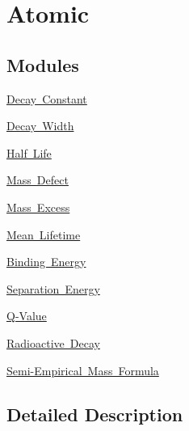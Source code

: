 \hypertarget{group___e_g_x_phys-_atomic}{}\section{Atomic}
\label{group___e_g_x_phys-_atomic}
\subsection*{Modules}
\begin{DoxyCompactItemize}
\item 
\mbox{\hyperlink{group___e_g_x_phys-_decay_constant}{Decay Constant}}
\item 
\mbox{\hyperlink{group___e_g_x_phys-_decay_width}{Decay Width}}
\item 
\mbox{\hyperlink{group___e_g_x_phys-_half_life}{Half Life}}
\item 
\mbox{\hyperlink{group___e_g_x_phys-_mass_defect}{Mass Defect}}
\item 
\mbox{\hyperlink{group___e_g_x_phys-_mass_excess}{Mass Excess}}
\item 
\mbox{\hyperlink{group___e_g_x_phys-_mean_lifetime}{Mean Lifetime}}
\item 
\mbox{\hyperlink{group___e_g_x_phys-_nuclear_binding_energy}{Binding Energy}}
\item 
\mbox{\hyperlink{group___e_g_x_phys-_nuclear_separation_energy}{Separation Energy}}
\item 
\mbox{\hyperlink{group___e_g_x_phys-_q_value}{Q-\/\+Value}}
\item 
\mbox{\hyperlink{group___e_g_x_phys-_radioactive_decay}{Radioactive Decay}}
\item 
\mbox{\hyperlink{group___e_g_x_phys-_semi_empirical_mass_formula}{Semi-\/\+Empirical Mass Formula}}
\end{DoxyCompactItemize}


\subsection{Detailed Description}
